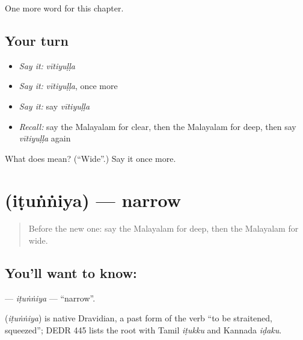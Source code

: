\begin{grammarlens}[title={What you've built}]
One more word for this chapter.
\end{grammarlens}

\subsection*{Your turn}
\begin{itemize}
\raggedright
  \item \emph{Say it:} \emph{vītiyuḷḷa}
  \item \emph{Say it:} \emph{vītiyuḷḷa}, once more
  \item \emph{Say it:} say \emph{vītiyuḷḷa}
  \item \emph{Recall:} say the Malayalam for clear, then the Malayalam for deep, then say \emph{vītiyuḷḷa} again
\end{itemize}

\begin{tcolorbox}[breakable,colback=teal!4,colframe=teal!35!black,title={Before you move on}]
What does  mean? (\textquotedblleft{}Wide\textquotedblright{}.) Say it once more.
\end{tcolorbox}
\section[\texorpdfstring{\ml{ഇടുങ്ങിയ} (iṭuṅṅiya)}{ഇടുങ്ങിയ (iṭuṅṅiya)}]{ (iṭuṅṅiya) — narrow}

\label{lesson:ML-C168-itunniya}



\begin{quote}
Before the new one: say the Malayalam for deep, then the Malayalam for wide.
\end{quote}

\subsection*{You'll want to know: }
\textbf{} — \emph{iṭuṅṅiya} — \textquotedblleft{}narrow\textquotedblright{}.

\begin{cousinweb}
\textbf{} (\emph{iṭuṅṅiya}) is native Dravidian, a past form of the verb \textquotedblleft{}to be straitened, squeezed\textquotedblright{}; DEDR 445 lists the root with Tamil \emph{iṭukku} and Kannada \emph{iḍaku}.
\end{cousinweb}

